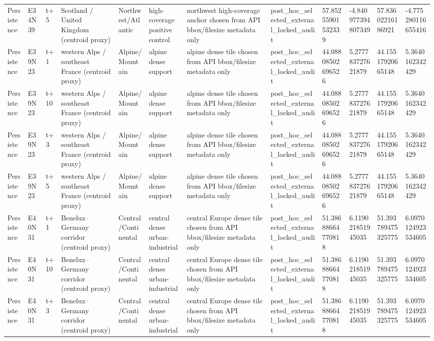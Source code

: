 \begin{landscape}
\begin{longtable}{llllllllllll}
Persistence & E34N39 & t+5 & Scotland / United Kingdom (centroid proxy) & Northwest/Atlantic & high-coverage positive control & northwest high-coverage anchor chosen from API bbox/filesize metadata only & post\_hoc\_selected\_external\_locked\_audit & 57.85255901532339 & -4.840977394807349 & 57.83602216186921 & -4.775280116655416 \\
Persistence & E39N23 & t+1 & western Alps / southeast France (centroid proxy) & Alpine/Mountain & alpine dense support & alpine dense tile chosen from API bbox/filesize metadata only & post\_hoc\_selected\_external\_locked\_audit & 44.08808502696526 & 5.277783727621879 & 44.15517920665148 & 5.3640162342429 \\
Persistence & E39N23 & t+10 & western Alps / southeast France (centroid proxy) & Alpine/Mountain & alpine dense support & alpine dense tile chosen from API bbox/filesize metadata only & post\_hoc\_selected\_external\_locked\_audit & 44.08808502696526 & 5.277783727621879 & 44.15517920665148 & 5.3640162342429 \\
Persistence & E39N23 & t+3 & western Alps / southeast France (centroid proxy) & Alpine/Mountain & alpine dense support & alpine dense tile chosen from API bbox/filesize metadata only & post\_hoc\_selected\_external\_locked\_audit & 44.08808502696526 & 5.277783727621879 & 44.15517920665148 & 5.3640162342429 \\
Persistence & E39N23 & t+5 & western Alps / southeast France (centroid proxy) & Alpine/Mountain & alpine dense support & alpine dense tile chosen from API bbox/filesize metadata only & post\_hoc\_selected\_external\_locked\_audit & 44.08808502696526 & 5.277783727621879 & 44.15517920665148 & 5.3640162342429 \\
Persistence & E40N31 & t+1 & Benelux–Germany corridor (centroid proxy) & Central/Continental & central dense urban-industrial & central Europe dense tile chosen from API bbox/filesize metadata only & post\_hoc\_selected\_external\_locked\_audit & 51.38688664770818 & 6.119021851945035 & 51.393789475325775 & 6.0970124923534605 \\
Persistence & E40N31 & t+10 & Benelux–Germany corridor (centroid proxy) & Central/Continental & central dense urban-industrial & central Europe dense tile chosen from API bbox/filesize metadata only & post\_hoc\_selected\_external\_locked\_audit & 51.38688664770818 & 6.119021851945035 & 51.393789475325775 & 6.0970124923534605 \\
Persistence & E40N31 & t+3 & Benelux–Germany corridor (centroid proxy) & Central/Continental & central dense urban-industrial & central Europe dense tile chosen from API bbox/filesize metadata only & post\_hoc\_selected\_external\_locked\_audit & 51.38688664770818 & 6.119021851945035 & 51.393789475325775 & 6.0970124923534605 \\

\end{longtable}
\end{landscape}
